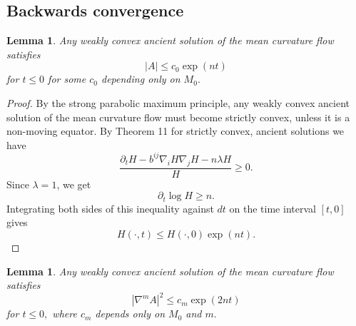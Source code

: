 \documentclass{amsart}
\newtheorem{lemma}[theorem]{Lemma}
\theoremstyle{definition}
\theoremstyle{remark}
\numberwithin{equation}{section}
\begin{document}
\subsection{Backwards convergence}
\begin{lemma}\label{cor: backward limit of principal curvatures}
Any weakly convex ancient solution of the mean curvature flow satisfies
\[|A|\leq c_0\exp(nt)\]
for $t\le 0$
for some $c_0$ depending only on $M_0.$
\end{lemma}
\begin{proof}
By the strong  parabolic maximum principle, any weakly convex ancient solution of the mean curvature flow must become strictly convex, unless it is a non-moving equator. By Theorem 11 for strictly convex, ancient solutions we have
\[\frac{\partial_tH-b^{ij}\nabla_iH\nabla_jH-n\lambda H}{H}\geq 0.\]
Since $\lambda =1$, we get
\[\partial_t\log H\geq n.\]
Integrating both sides of this inequality against $dt$ on the time interval $[t,0]$ gives
\[H(\cdot,t)\leq H(\cdot,0)\exp(nt).\]
\end{proof}
\begin{lemma}
Any weakly convex ancient solution of the mean curvature flow satisfies
\[|\nabla^mA|^2\leq c_m\exp(2nt)\]
for $t\le 0,$ where $c_m$ depends only on $M_0$ and $m.$
\end{lemma}
\end{document}
